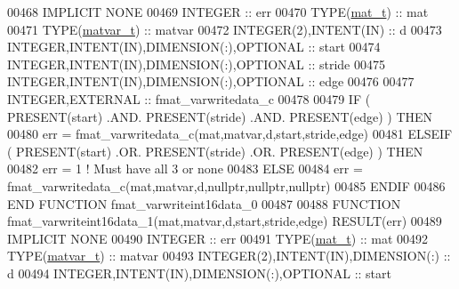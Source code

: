\begin{DoxyCode}
00468 \textcolor{keywordtype}{IMPLICIT NONE}
00469     \textcolor{keywordtype}{INTEGER}                                  :: err
00470     \textcolor{keywordtype}{TYPE}(\hyperlink{group___m_a_t_gab0fc888f5a5d79943b16284b1f91c2e8}{mat\_t})                              :: mat
00471     \textcolor{keywordtype}{TYPE}(\hyperlink{group___m_a_t_structmatvar__t}{matvar\_t})                           :: matvar
00472     \textcolor{keywordtype}{INTEGER(2)},\textcolor{keywordtype}{INTENT(IN)}                    :: d
00473     \textcolor{keywordtype}{INTEGER},\textcolor{keywordtype}{INTENT(IN)},\textcolor{keywordtype}{DIMENSION(:)},\textcolor{keywordtype}{OPTIONAL} :: start
00474     \textcolor{keywordtype}{INTEGER},\textcolor{keywordtype}{INTENT(IN)},\textcolor{keywordtype}{DIMENSION(:)},\textcolor{keywordtype}{OPTIONAL} :: stride
00475     \textcolor{keywordtype}{INTEGER},\textcolor{keywordtype}{INTENT(IN)},\textcolor{keywordtype}{DIMENSION(:)},\textcolor{keywordtype}{OPTIONAL} :: edge
00476 
00477     \textcolor{keywordtype}{INTEGER},\textcolor{keywordtype}{EXTERNAL}                         :: fmat\_varwritedata\_c
00478 
00479     \textcolor{keywordflow}{IF} ( \textcolor{keyword}{PRESENT}(start) .AND. \textcolor{keyword}{PRESENT}(stride) .AND. \textcolor{keyword}{PRESENT}(edge) ) \textcolor{keywordflow}{THEN}
00480         err = fmat\_varwritedata\_c(mat,matvar,d,start,stride,edge)
00481     \textcolor{keywordflow}{ELSEIF} ( \textcolor{keyword}{PRESENT}(start) .OR. \textcolor{keyword}{PRESENT}(stride) .OR. \textcolor{keyword}{PRESENT}(edge) ) \textcolor{keywordflow}{THEN}
00482         err = 1    \textcolor{comment}{! Must have all 3 or none}
00483     \textcolor{keywordflow}{ELSE}
00484         err = fmat\_varwritedata\_c(mat,matvar,d,nullptr,nullptr,nullptr)
00485 \textcolor{keywordflow}{    ENDIF}
00486 \textcolor{keyword}{END FUNCTION }fmat\_varwriteint16data\_0
00487 
00488 \textcolor{keyword}{FUNCTION }fmat\_varwriteint16data\_1(mat,matvar,d,start,stride,edge) \textcolor{keyword}{RESULT}(err)
00489 \textcolor{keywordtype}{IMPLICIT NONE}
00490     \textcolor{keywordtype}{INTEGER}                                  :: err
00491     \textcolor{keywordtype}{TYPE}(\hyperlink{group___m_a_t_gab0fc888f5a5d79943b16284b1f91c2e8}{mat\_t})                              :: mat
00492     \textcolor{keywordtype}{TYPE}(\hyperlink{group___m_a_t_structmatvar__t}{matvar\_t})                           :: matvar
00493     \textcolor{keywordtype}{INTEGER(2)},\textcolor{keywordtype}{INTENT(IN)},\textcolor{keywordtype}{DIMENSION(:)}       :: d
00494     \textcolor{keywordtype}{INTEGER},\textcolor{keywordtype}{INTENT(IN)},\textcolor{keywordtype}{DIMENSION(:)},\textcolor{keywordtype}{OPTIONAL} :: start

\end{DoxyCode}
